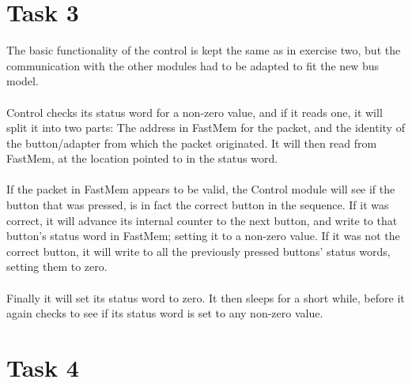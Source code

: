 \documentclass[11pt]{report}
\begin{document}
  



\section*{Task 3}
The basic functionality of the control is kept the same as in exercise two, but
the communication with the other modules had to be adapted to fit the new bus
model.\\
\\Control checks its status word for a non-zero value, and if it reads one, it
will split it into two parts: The address in FastMem for the packet, and the
identity of the button/adapter from which the packet originated. It will then
read from FastMem, at the location pointed to in the status word.\\
\\If the packet in FastMem appears to be valid, the Control module will see if
the button that was pressed, is in fact the correct button in the sequence. If
it was correct, it will advance its internal counter to the next button, and
write to that button's status word in FastMem; setting it to a non-zero value.
If it was not the correct button, it will write to all the previously pressed
buttons' status words, setting them to zero.\\
\\Finally it will set its status word to zero. It then sleeps for a short 
while, before it again checks to see if its status word is set to any non-zero 
value.

\section*{Task 4}
\end{document}
